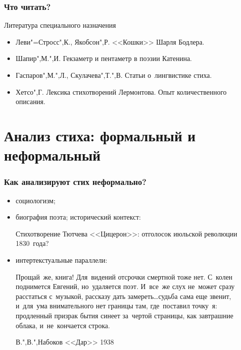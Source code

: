 \documentclass{beamer}
\begin{document}


\begin{frame}
\frametitle{Что читать?}
Литература специального назначения
\begin{itemize}
\item Леви"=Стросс",К., Якобсон",Р. <<Кошки>> Шарля Бодлера.
\item Шапир",М.",И. Гекзаметр и пентаметр в поэзии Катенина.
\item Гаспаров",М.",Л., Скулачева",Т.",В. Статьи о~лингвистике стиха.
\item Хетсо",Г. Лексика стихотворений Лермонтова. Опыт количественного описания.
\end{itemize}
\end{frame}

\section{Анализ стиха: формальный и неформальный}\label{sec:formal}


\begin{frame}
\frametitle{Как анализируют стих неформально?}
\begin{itemize}
\item социологизм; 
\item биография поэта; исторический контекст: \\
\begin{flushleft}
Стихотворение Тютчева <<Цицерон>>: отголосок июльской революции 1830~года?
\end{flushleft}
\item интертекстуальные параллели: \\
\begin{flushleft}
Прощай~же, книга! Для~видений отсрочки смертной тоже нет. С~колен поднимется Евгений, но~удаляется поэт. И~все~же слух не~может сразу расстаться с~музыкой, рассказу дать замереть\ldots судьба сама еще звенит, и~для~ума внимательного нет границы там, где~поставил точку~я: продленный призрак бытия синеет за~чертой страницы, как завтрашние облака, и~не~кончается строка.
\end{flushleft}

В.",В.",Набоков <<Дар>>
1938

\end{itemize}

\end{frame}
\end{document}

